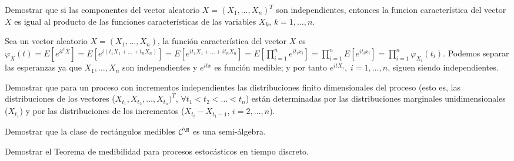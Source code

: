 \begin{ejer}
  Demostrar que si las componentes del vector aleatorio $X = (X_1, \ldots, X_n)^T$ son independientes, entonces la funcion característica del vector $X$ es igual al producto de las funciones características de las variables $X_k$, $k = 1, \ldots, n$.
\end{ejer}

\begin{sol}
  Sea un vector aleatorio $X = (X_1, \ldots, X_n)$, la función característica del vector $X$ es $\varphi_X(t) = E[e^{it^tX}] = E[e^{i(t_1 X_1 + \ldots + t_n X_n)}] = E[e^{i t_1 X_1 + \ldots + i t_n X_n}] = E[\prod \limits^n_{i = 1} e^{i t_i x_i}] = \prod \limits^n_{i = 1} E[e^{i t_i x_i}] = \prod \limits^n_{i = 1} \varphi_{X_i} (t_i)$. Podemos separar las esperanzas ya que $X_1, \ldots, X_n$ son independientes y $e^{itx}$ es función medible; y por tanto $e^{itX_i}, \; i = 1, \ldots, n$, siguen siendo independientes.
\end{sol}

\begin{ejer}
  Demostrar que para un proceso con incrementos independientes las distribuciones finito dimensionales del proceso (esto es, las distribuciones de los vectores ($X_{t_1}, X_{t_2}, \ldots, X_{t_n})^T$, $\forall t_1 < t_2 < \ldots < t_n$) están determinadas por las distribuciones marginales unidimensionales ($X_{t_1}$) y por las distribuciones de los incrementos ($X_{t_i} - X_{t_1 - 1}$, $i = 2, \ldots, n$).
\end{ejer}

\begin{sol}
\end{sol}

\begin{ejer}
  Demostrar que la clase de rectángulos medibles $\mathcal{C}^\N$ es una semi-álgebra.
\end{ejer}

\begin{sol}
\end{sol}

\begin{ejer}
  Demostrar el Teorema de medibilidad para procesos estocásticos en tiempo discreto.
\end{ejer}

\begin{sol}
\end{sol}
